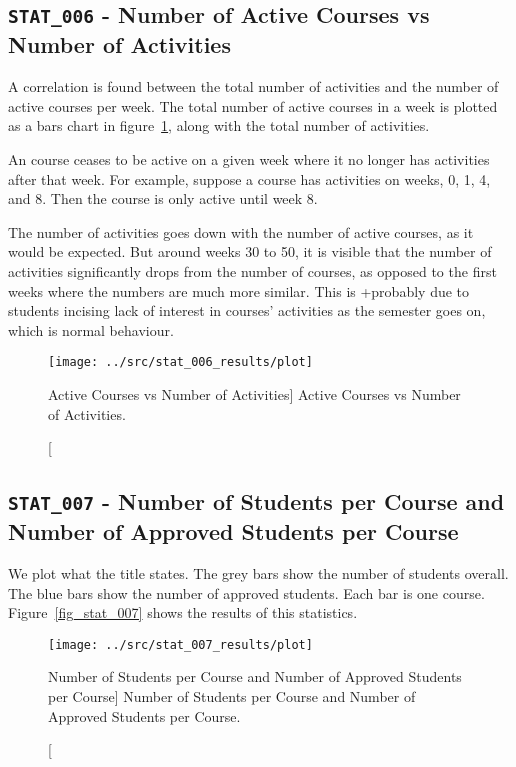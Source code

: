 \subsection{\texttt{STAT\_006} - Number of Active Courses vs Number of
Activities}
\label{sec:stat_006}

A correlation is found between the total number of activities and the number of
active courses per week. The total number of active courses in a week is
plotted as a bars chart in figure~\ref{fig:stat_006}, along with the total
number of activities.

An course ceases to be active on a given week where it no longer has activities
after that week. For example, suppose a course has activities on weeks, 0, 1,
4, and 8. Then the course is only active until week 8.

The number of activities goes down with the number of active courses, as it
would be expected. But around weeks 30 to 50, it is visible that the number of
activities significantly drops from the number of courses, as opposed to the
first weeks where the numbers are much more similar. This is +probably due to
students incising lack of interest in courses' activities as the semester goes
on, which is normal behaviour.

\begin{figure}[h!]
    \centering

    \texttt{[image: ../src/stat\_006\_results/plot]}

    \caption
        [Active Courses vs Number of Activities]
        {Active Courses vs Number of Activities.}

    \label{fig:stat_006}
\end{figure}

\subsection{\texttt{STAT\_007} - Number of Students per Course and Number of
Approved Students per Course}

We plot what the title states. The grey bars show the number of students
overall. The blue bars show the number of approved students. Each bar is one
course. Figure~\ref{fig_stat_007} shows the results of this statistics.

\begin{figure}[h!]
    \centering

    \texttt{[image: ../src/stat\_007\_results/plot]}

    \caption
        [Number of Students per Course and Number of Approved Students per
        Course]
        {Number of Students per Course and Number of Approved Students per
        Course.}

    \label{fig:stat_007}
\end{figure}

